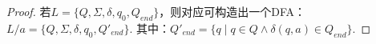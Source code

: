 \begin{proof}
    若$L=\{Q,\Sigma,\delta,q_0,Q_{end}\}$，则对应可构造出一个DFA：$L/a=\{Q,\Sigma,\delta,q_0,Q'_{end}\}$.
    其中：$Q'_{end}=\{ q \mid q\in Q \wedge \delta(q,a)\in Q_{end} \}$.
\end{proof}